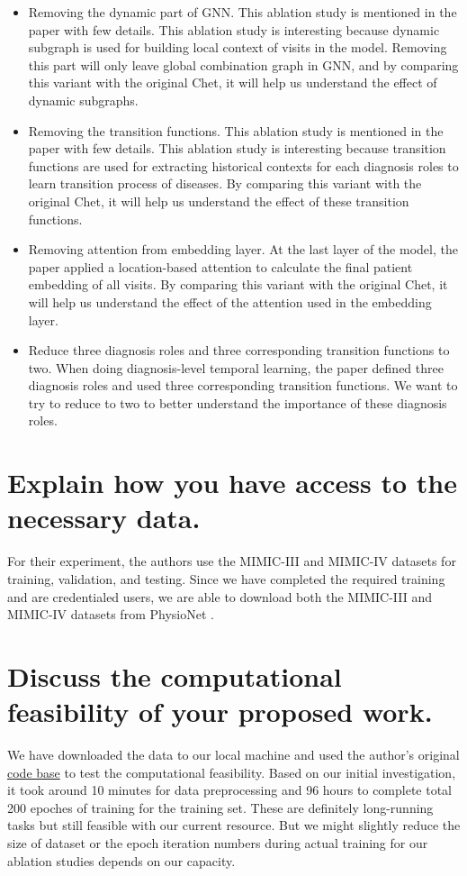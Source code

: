 \documentclass[11pt,a4paper]{article}
\begin{document}
\begin{itemize}
  \item Removing the dynamic part of GNN. This ablation study is mentioned in the paper with few details. This ablation study is interesting 
  because dynamic subgraph is used for building local context of visits in the model. Removing this part will only leave global combination
  graph in GNN, and by comparing this variant with the original Chet, it will help us understand the effect of dynamic subgraphs.
  \item Removing  the transition functions. This ablation study is mentioned in the paper with few details. This ablation study is interesting 
  because transition functions are used for extracting historical contexts for each diagnosis roles to learn transition process of diseases. By 
  comparing this variant with the original Chet, it will help us understand the effect of these transition functions.
  \item Removing attention from embedding layer. At the last layer of the model, the paper applied a location-based attention to calculate the 
  final patient embedding of all visits. By comparing this variant with the original Chet, it will help us understand the effect of the attention
  used in the embedding layer.
  \item Reduce three diagnosis roles and three corresponding transition functions to two. When doing diagnosis-level temporal learning, the paper 
  defined three diagnosis roles and used three corresponding transition functions. We want to try to reduce to two to better understand the importance
  of these diagnosis roles.
\end{itemize}

\section{Explain how you have access to the necessary data.}
For their experiment, the authors use the MIMIC-III \cite{mimic3} and MIMIC-IV
\cite{mimic4} datasets for training, validation, and testing. Since we have
completed the required training and are credentialed users, we are able to
download both the MIMIC-III and MIMIC-IV datasets from PhysioNet
\cite{physionet}.

\section{Discuss the computational feasibility of your proposed work.}
We have downloaded the data to our local machine and used the author's 
original \href{https://github.com/LuChang-CS/Chet}{code base} to test 
the computational feasibility. Based on our initial investigation, 
it took around 10 minutes for data preprocessing and 96 hours to complete 
total 200 epoches of training for the training set. These are definitely
long-running tasks but still feasible with our current resource. But we might
slightly reduce the size of dataset or the epoch iteration numbers during actual training
for our ablation studies depends on our capacity.
\end{document}
